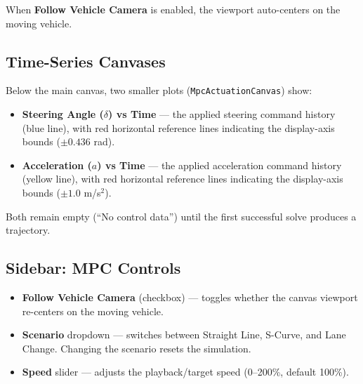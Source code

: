 ﻿\documentclass[11pt,a4paper]{article}
\begin{document}
When \textbf{Follow Vehicle Camera} is enabled, the viewport auto-centers on the moving vehicle.

\subsection{Time-Series Canvases}
Below the main canvas, two smaller plots (\texttt{MpcActuationCanvas}) show:
\begin{itemize}[leftmargin=1.2cm]
  \item \textbf{Steering Angle ($\delta$) vs Time} --- the applied steering command history (blue line), with red horizontal reference lines indicating the display-axis bounds ($\pm 0.436$ rad).
  \item \textbf{Acceleration ($a$) vs Time} --- the applied acceleration command history (yellow line), with red horizontal reference lines indicating the display-axis bounds ($\pm 1.0$ m/s$^2$).
\end{itemize}
Both remain empty (``No control data'') until the first successful solve produces a trajectory.

\subsection{Sidebar: MPC Controls}
\begin{itemize}[leftmargin=1.2cm]
  \item \textbf{Follow Vehicle Camera} (checkbox) --- toggles whether the canvas viewport re-centers on the moving vehicle.
  \item \textbf{Scenario} dropdown --- switches between Straight Line, S-Curve, and Lane Change. Changing the scenario resets the simulation.
  \item \textbf{Speed} slider --- adjusts the playback/target speed (0--200\%, default 100\%).
\end{itemize}
\end{document}

